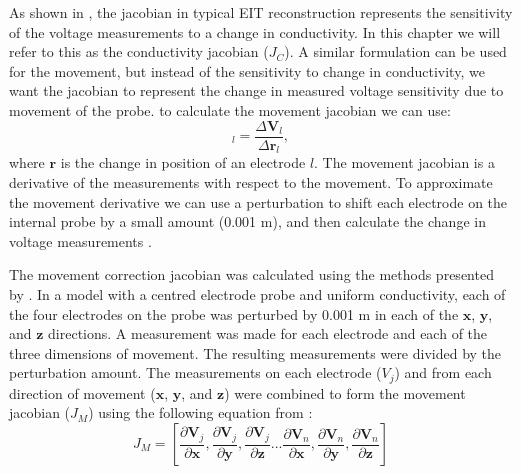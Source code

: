 As shown in , the jacobian in typical EIT reconstruction 
represents the sensitivity of the voltage measurements to a change in conductivity. 
In this chapter we will refer to this as the conductivity jacobian ($J_C$). 
A similar formulation can be used for the movement, but instead of the sensitivity 
to change in conductivity, we want the jacobian to represent the 
change in measured voltage 
sensitivity due to movement of the probe. to calculate the movement jacobian we can use:
\begin{equation}
	[J_M]_l = \frac{\Delta\mathbf{V}_l}{\Delta\mathbf{r}_l},
\end{equation}
where $\mathbf{r}$ is the change in position of an electrode $l$.
The movement jacobian is a derivative of the measurements with respect to the movement.
To approximate the movement derivative we can use a perturbation to 
shift each electrode on the internal probe by a small amount (0.001 m), and then calculate the 
change in voltage measurements \parencite{gomez-laberge_direct_2008}.

The movement correction jacobian was calculated using the methods presented by
. In a model with a centred electrode
probe and uniform conductivity, each of the four electrodes on the probe was
perturbed by 0.001 m in each of the $\mathbf x$, $\mathbf y$, 
and $\mathbf z$ directions. A measurement was made for 
each electrode and each of the three dimensions of movement. 
The resulting measurements were divided by the perturbation 
amount. 
The measurements on each electrode ($V_j$) and from each  direction 
of movement ($\mathbf x$, $\mathbf y$, 
and $\mathbf z$) were combined to form the movement 
jacobian ($J_M$) using the following equation from
:
\begin{equation}
	J_M = \left[ 
		  \frac{\partial\mathbf{V}_j}{\partial\mathbf{x}},
		  \frac{\partial\mathbf{V}_j}{\partial\mathbf{y}},
	      \frac{\partial\mathbf{V}_j}{\partial\mathbf{z}} ... 
		  \frac{\partial\mathbf{V}_n}{\partial\mathbf{x}},
		  \frac{\partial\mathbf{V}_n}{\partial\mathbf{y}},
	      \frac{\partial\mathbf{V}_n}{\partial\mathbf{z}} 
		  \right]
\end{equation}


